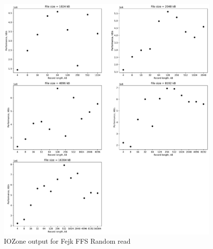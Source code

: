 \begin{figure}[!htb]
	\label{fig:app_bench_fffs_rnd_read}
	\begin{center}
		\includegraphics[width=1.0\textwidth]{figures/benchmarking/fejk-ffs/Random read.pdf}
	\end{center}
	\caption{IOZone output for Fejk FFS Random read}
\end{figure}

